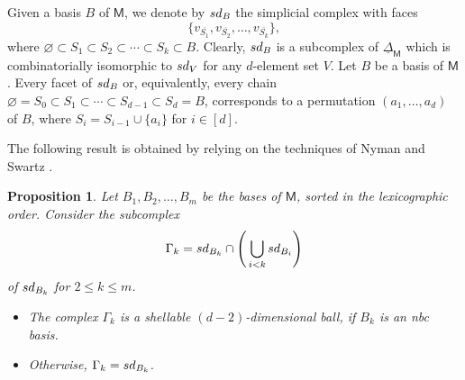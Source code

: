 \documentclass[11pt]{amsart}
\theoremstyle{theorems}
\newtheorem{proposition}[theorem]{Proposition}
\theoremstyle{definition}
\newcommand{\sd}{{\rm sd}}
\newcommand{\M}{{\mathsf{M}}}
\newcommand{\uDelta}{\underline{\Delta}}
\begin{document}
Given a basis $B$ of $\M$, we 
denote by $\sd_B$ the simplicial complex with faces 
%
\[ \{ v_{\overline{S_1}}, 
      v_{\overline{S_2}},\dots,v_{\overline{S_k}} 
			\}, \]
%
where $\varnothing \subset S_1 \subset S_2 \subset \cdots 
\subset S_k \subset B$. Clearly, $\sd_B$ is a subcomplex of 
$\uDelta_{\M}$ which is combinatorially isomorphic to $\sd_V$ 
for any $d$-element set $V$. Let $B$ be a basis of $\M$. 
Every facet of $\sd_B$ or, equivalently, every 
chain $\varnothing = S_0 \subset S_1 \subset \cdots \subset 
S_{d-1} \subset S_d = B$, corresponds to a permutation 
$(a_1,\ldots,a_d)$ of $B$, where $S_i = S_{i-1}\cup \{a_i\}$ 
for $i\in [d]$.

The following result is obtained by relying on the techniques 
of Nyman and Swartz \cite[Section~4]{NS04}. 

\begin{proposition} \label{prop:NS04}
    Let $B_1, B_2,\dots,B_m$ be the bases of $\M$, 
    sorted in the lexicographic order. Consider  
    the subcomplex 
    \begin{equation} \label{eq:intersect-sd}
      \Gamma_k = \sd_{B_k} \cap 
    	\left( \, \bigcup_{i<k} \sd_{B_i} \right)
    \end{equation}
    of $\sd_{B_k}$ for $2 \le k \le m$. 
    \begin{itemize}
    \item[{\rm (a)}] 
    The complex $\Gamma_k$ is a shellable 
    $(d-2)$-dimensional ball, if $B_k$ is an nbc basis. 
    
    \item[{\rm (b)}] 
    Otherwise, $\Gamma_k = \sd_{B_k}$.
    \end{itemize}
\end{proposition}
\end{document}
